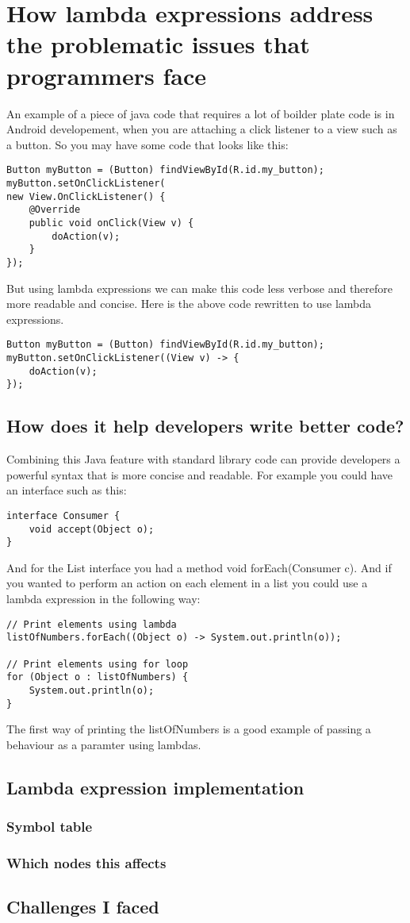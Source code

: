 \documentclass[twocolumn,notitlepage]{report}
\begin{document}
\section*{How lambda expressions address the problematic issues that programmers face}
An example of a piece of java code that requires a lot of boilder plate code is
in Android developement, when you are attaching a click listener to a view such
as a button. So you may have some code that looks like this:
\begin{lstlisting}
Button myButton = (Button) findViewById(R.id.my_button);
myButton.setOnClickListener(
new View.OnClickListener() {
	@Override
	public void onClick(View v) {
		doAction(v);
	}
});
\end{lstlisting}
But using lambda expressions we can make this code less verbose and therefore
more readable and concise. Here is the above code rewritten to use lambda
expressions.
\newpage
\begin{lstlisting}
Button myButton = (Button) findViewById(R.id.my_button);
myButton.setOnClickListener((View v) -> {
	doAction(v);
});
\end{lstlisting}

\subsection*{How does it help developers write better code?}
Combining this Java feature with standard library code can provide developers a powerful syntax 
that is more concise and readable. For example you could have an interface such as this:
\begin{lstlisting}
interface Consumer {
	void accept(Object o);
}
\end{lstlisting}
And for the {\ttfamily List} interface you had a method {\ttfamily void
forEach(Consumer c)}.  And if you wanted to perform an action on each element
in a list you could use a lambda expression in the following way:
\begin{lstlisting}
// Print elements using lambda
listOfNumbers.forEach((Object o) -> System.out.println(o));

// Print elements using for loop
for (Object o : listOfNumbers) {
	System.out.println(o);
}
\end{lstlisting}
The first way of printing the listOfNumbers is a good example of passing a
behaviour as a paramter using lambdas.
\cite{website:why-we-need-lambda-expressions-in-java}


\subsection*{Lambda expression implementation}
\subsubsection*{Symbol table}
\subsubsection*{Which nodes this affects}
\subsection*{Challenges I faced}




\end{document}
